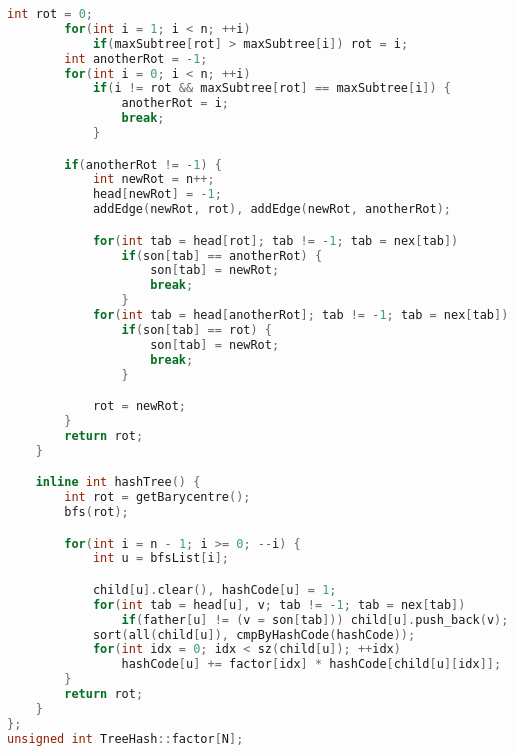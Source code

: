 \begin{lstlisting}[language=c++]
		int rot = 0;
		for(int i = 1; i < n; ++i)
			if(maxSubtree[rot] > maxSubtree[i]) rot = i;
		int anotherRot = -1;
		for(int i = 0; i < n; ++i)
			if(i != rot && maxSubtree[rot] == maxSubtree[i]) {
				anotherRot = i;
				break;
			}

		if(anotherRot != -1) {
			int newRot = n++;
			head[newRot] = -1;
			addEdge(newRot, rot), addEdge(newRot, anotherRot);

			for(int tab = head[rot]; tab != -1; tab = nex[tab])
				if(son[tab] == anotherRot) {
					son[tab] = newRot;
					break;
				}
			for(int tab = head[anotherRot]; tab != -1; tab = nex[tab])
				if(son[tab] == rot) {
					son[tab] = newRot;
					break;
				}

			rot = newRot;
		}
		return rot;
	}

	inline int hashTree() {
		int rot = getBarycentre();
		bfs(rot);

		for(int i = n - 1; i >= 0; --i) {
			int u = bfsList[i];

			child[u].clear(), hashCode[u] = 1;
			for(int tab = head[u], v; tab != -1; tab = nex[tab])
				if(father[u] != (v = son[tab])) child[u].push_back(v);
			sort(all(child[u]), cmpByHashCode(hashCode));
			for(int idx = 0; idx < sz(child[u]); ++idx)
				hashCode[u] += factor[idx] * hashCode[child[u][idx]];
		}
		return rot;
	}
};
unsigned int TreeHash::factor[N];


\end{lstlisting}
